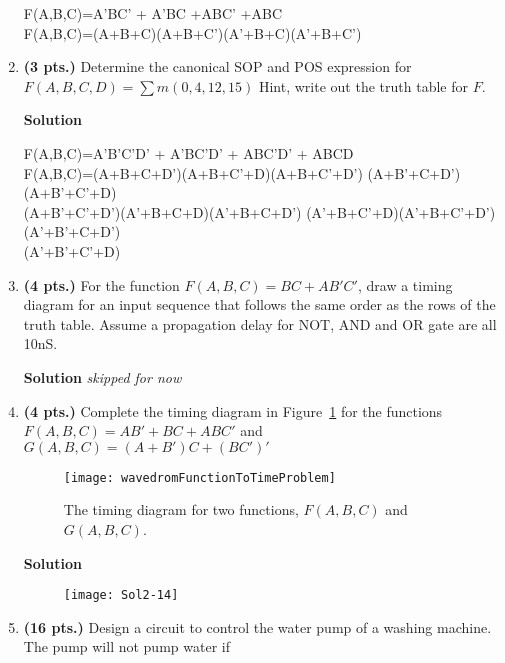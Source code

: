 \begin{enumerate}
\begin{onlysolution}
F(A,B,C)=A'BC' + A'BC +ABC' +ABC  \\
F(A,B,C)=(A+B+C)(A+B+C')(A'+B+C)(A'+B+C')
\end{onlysolution}

\item \textbf{ (3 pts.)} Determine the canonical SOP and POS expression for 
$F(A,B,C,D) = \sum m(0,4,12,15)$ Hint, write out the truth table for $F$.

\begin{onlysolution}  \textbf{Solution} \itshape

F(A,B,C)=A'B'C'D' + A'BC'D' + ABC'D' + ABCD  \\
F(A,B,C)=(A+B+C+D')(A+B+C'+D)(A+B+C'+D') (A+B'+C+D')(A+B'+C'+D) \\
(A+B'+C'+D')(A'+B+C+D)(A'+B+C+D') (A'+B+C'+D)(A'+B+C'+D')(A'+B'+C+D')\\
(A'+B'+C'+D)
\end{onlysolution}

\item \textbf{ (4 pts.)} For the function $F(A,B,C)= BC+AB'C'$,  draw
a timing diagram for an input sequence that follows the same order 
as the rows of the truth table.  Assume a propagation delay for NOT, 
AND and OR gate are all 10nS.

\begin{onlysolution}  \textbf{Solution} \itshape 
skipped for now
\end{onlysolution}

\item \textbf{ (4 pts.)} Complete the timing diagram in Figure~\ref{fig:HWtime}
for the functions
$F(A,B,C) = AB' + BC + ABC'$ and $G(A,B,C) = (A+B')C + (BC')'$
\begin{figure}[ht]
\texttt{[image: wavedromFunctionToTimeProblem]}
\caption{The timing diagram for two functions, $F(A,B,C)$ and $G(A,B,C)$.}
\label{fig:HWtime}
\end{figure}

\begin{onlysolution}  \textbf{Solution} \itshape

\begin{figure}[ht]
\texttt{[image: Sol2-14]}
\end{figure}
\end{onlysolution}

\item\textbf{ (16 pts.)} Design a circuit to control
the water pump of a washing machine.  The pump will not pump 
water if
                                                                                

\end{enumerate}
